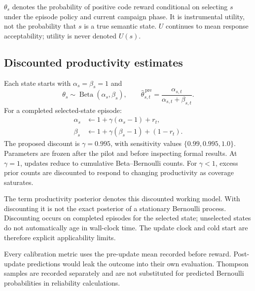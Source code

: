\documentclass[final,5p,times,number]{elsarticle}
\begin{document}
$\theta_s$ denotes the probability of positive code reward conditional on selecting $s$ under the episode policy and current campaign phase. It is instrumental utility, not the probability that $s$ is a true semantic state. $U$ continues to mean response acceptability; utility is never denoted $U(s)$.

\subsection{Discounted productivity estimates}
Each state starts with $\alpha_s=\beta_s=1$ and
\begin{equation}
\theta_s\sim\operatorname{Beta}(\alpha_s,\beta_s),\qquad
\widehat{\theta}_{s,t}^{\,\mathrm{pre}}
=\frac{\alpha_{s,t}}{\alpha_{s,t}+\beta_{s,t}}.
\end{equation}
For a completed selected-state episode:
\begin{align}
\alpha_s&\leftarrow1+\gamma(\alpha_s-1)+r_t,\\
\beta_s&\leftarrow1+\gamma(\beta_s-1)+(1-r_t).
\label{eq:update}
\end{align}
The proposed discount is $\gamma=0.995$, with sensitivity values $\{0.99,0.995,1.0\}$. Parameters are frozen after the pilot and before inspecting formal results. At $\gamma=1$, updates reduce to cumulative Beta--Bernoulli counts. For $\gamma<1$, excess prior counts are discounted to respond to changing productivity as coverage saturates.

The term productivity posterior denotes this discounted working model. With discounting it is not the exact posterior of a stationary Bernoulli process. Discounting occurs on completed episodes for the selected state; unselected states do not automatically age in wall-clock time. The update clock and cold start are therefore explicit applicability limits.

Every calibration metric uses the pre-update mean recorded before reward. Post-update predictions would leak the outcome into their own evaluation. Thompson samples are recorded separately and are not substituted for predicted Bernoulli probabilities in reliability calculations.
\end{document}
